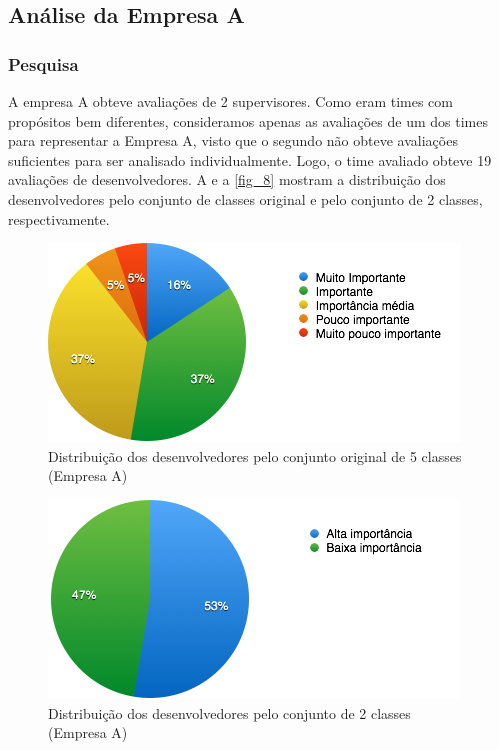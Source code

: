 \subsection{Análise da Empresa A}

\subsubsection{Pesquisa}

A empresa A obteve avaliações de 2 supervisores. Como eram times com propósitos bem diferentes, consideramos apenas as avaliações de um dos times para representar a Empresa A, visto que o segundo não obteve avaliações suficientes para ser analisado individualmente. Logo, o time avaliado obteve 19 avaliações de desenvolvedores. A  e a \autoref{fig_8} mostram a distribuição dos desenvolvedores pelo conjunto de classes original e pelo conjunto de 2 classes, respectivamente.


\begin{figure}[h]
	\centering
	\includegraphics[scale=0.8]{figs/empresa_a/imagem-classe-original.png}
	\caption{\label{fig_7}Distribuição dos desenvolvedores pelo conjunto original de 5 classes (Empresa A)}
\end{figure}

\begin{figure}[h]
	\centering
	\includegraphics[scale=0.8]{figs/empresa_a/imagem-classe-alternativa.png}
	\caption{\label{fig_8}Distribuição dos desenvolvedores pelo conjunto de 2 classes (Empresa A)}
\end{figure}

